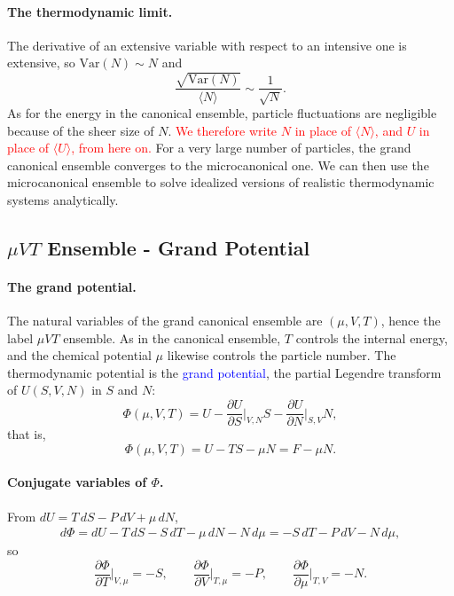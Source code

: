 \paragraph{The thermodynamic limit.}
The derivative of an extensive variable with respect to an intensive one is
extensive, so $\mathrm{Var}(N)\sim N$ and
\begin{equation}
    \boxed{\frac{\sqrt{\mathrm{Var}(N)}}{\langle N\rangle}\sim\frac{1}{\sqrt{N}}.}
\end{equation}
As for the energy in the canonical ensemble, particle fluctuations are
negligible because of the sheer size of $N$.
\textcolor{red}{We therefore write $N$ in place of $\langle N\rangle$, and $U$
in place of $\langle U\rangle$, from here on.}
For a very large number of particles, the grand canonical ensemble converges
to the microcanonical one. We can then use the microcanonical ensemble to
solve idealized versions of realistic thermodynamic systems analytically.

\subsection{$\mu VT$ Ensemble - Grand Potential}

\paragraph{The grand potential.}
The natural variables of the grand canonical ensemble are $(\mu,V,T)$, hence
the label $\mu VT$ ensemble. As in the canonical ensemble, $T$ controls the
internal energy, and the chemical potential $\mu$ likewise controls the
particle number. The thermodynamic potential is the
\textcolor{blue}{grand potential}, the partial Legendre transform of
$U(S,V,N)$ in $S$ and $N$:
\begin{equation*}
    \Phi(\mu,V,T)=U-\frac{\partial U}{\partial S}\bigg|_{V,N}S
    -\frac{\partial U}{\partial N}\bigg|_{S,V}N,
\end{equation*}
that is,
\begin{equation}
    \boxed{\Phi(\mu,V,T)=U-TS-\mu N=F-\mu N.}
\end{equation}

\paragraph{Conjugate variables of $\Phi$.}
From $dU=T\,dS-P\,dV+\mu\,dN$,
\begin{align*}
    d\Phi=dU-T\,dS-S\,dT-\mu\,dN-N\,d\mu=-S\,dT-P\,dV-N\,d\mu,
\end{align*}
so
\begin{equation}
    \boxed{\frac{\partial\Phi}{\partial T}\bigg|_{V,\mu}=-S,\qquad
    \frac{\partial\Phi}{\partial V}\bigg|_{T,\mu}=-P,\qquad
    \frac{\partial\Phi}{\partial\mu}\bigg|_{T,V}=-N.}
\end{equation}

